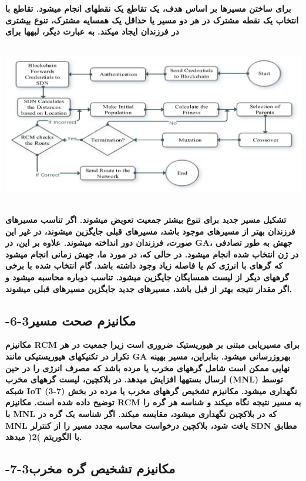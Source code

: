 \documentclass{article} %
\begin{document}
\noindent 
{\bf برای ساختن مسیرها بر اساس هدف، یک تقاطع یک نقطهای انجام میشود. تقاطع با انتخاب یک نقطه مشترک در هر دو مسیر یا حداقل یک همسایه مشترک، تنوع بیشتری در فرزندان ایجاد میکند. به عبارت دیگر، لبهها برای \includegraphics*[width=6.68in, height=3.09in]{image10}تشکیل مسیر جدید برای تنوع بیشتر جمعیت تعویض میشوند. اگر تناسب مسیرهای فرزندان بهتر از مسیرهای موجود باشد، مسیرهای قبلی جایگزین میشوند، در غیر این صورت، فرزندان دور انداخته میشوند. علاوه بر این، در GA، جهش به طور تصادفی در ژن انتخاب شده انجام میشود. در حالی که، در مورد ما، جهش زمانی انجام میشود که گرهای با انرژی کم یا فاصله زیاد وجود داشته باشد. گام انتخاب شده با برخی گرههای دیگر از لیست همسایگان جایگزین میشود. تناسب دوباره محاسبه میشود و اگر مقدار نتیجه بهتر از قبل باشد، مسیرهای جدید جایگزین مسیرهای قبلی میشوند.}

\noindent 
\subsection{ -6-3مکانیزم صحت مسیر}

\noindent 
{\bf مکانیزم RCM برای مسیریابی مبتنی بر هیوریستیک ضروری است زیرا جمعیت در هر تکرار در تکنیکهای هیوریستیکی مانند GA بهروزرسانی میشود. بنابراین، مسیر بهینه نهایی ممکن است شامل گرههای مخرب یا مرده باشد که مصرف انرژی را در حین ارسال بستهها افزایش میدهد. در بلاکچین، لیست گرههای مخرب (MNL) توسط شبکه IoT نگهداری میشود. مکانیزم تشخیص گرههای مخرب یا مرده در بخش (7-3) توضیح داده شده است. مکانیزم RCM به مسیر نتیجه نگاه میکند و شناسه هر گره را با MNL که در بلاکچین نگهداری میشود، مقایسه میکند. اگر شناسه یک گره در MNL یافت شود، بلاکچین درخواست محاسبه مجدد مسیر را از کنترلر SDN مطابق با الگوریتم )2( میدهد.}

\noindent 
\subsection{ -7-3مکانیزم تشخیص گره مخرب}
\end{document}
